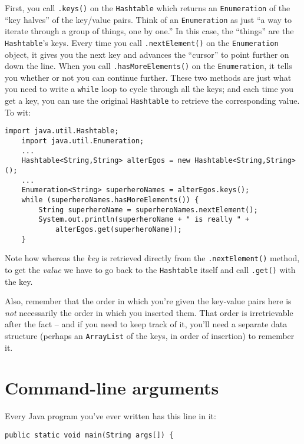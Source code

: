 First, you call \texttt{.keys()} on the \texttt{Hashtable} which returns an
\texttt{Enumeration} of the ``key halves'' of the key/value pairs. Think of an
\texttt{Enumeration} as just ``a way to iterate through a group of things, one
by one.'' In this case, the ``things'' are the \texttt{Hashtable}'s keys. Every
time you call \texttt{.nextElement()} on the \texttt{Enumeration} object, it
gives you the next key and advances the ``cursor'' to point further on down the
line. When you call \texttt{.hasMoreElements()} on the \texttt{Enumeration},
it tells you whether or not you can continue further. These two methods are
just what you need to write a \texttt{while} loop to cycle through all the
keys; and each time you get a key, you can use the original \texttt{Hashtable}
to retrieve the corresponding value. To wit:

\begin{Verbatim}[fontsize=\small,samepage=true,frame=single]
    import java.util.Hashtable;
    import java.util.Enumeration;
    ...
    Hashtable<String,String> alterEgos = new Hashtable<String,String>();
    ...
    Enumeration<String> superheroNames = alterEgos.keys();
    while (superheroNames.hasMoreElements()) {
        String superheroName = superheroNames.nextElement();
        System.out.println(superheroName + " is really " +
            alterEgos.get(superheroName));
    }
\end{Verbatim}

Note how whereas the \textit{key} is retrieved directly from the
\texttt{.nextElement()} method, to get the \textit{value} we have to go back
to the \texttt{Hashtable} itself and call \texttt{.get()} with the key.

Also, remember that the order in which you're given the key-value pairs here
is \textit{not} necessarily the order in which you inserted them. That order
is irretrievable after the fact -- and if you need to keep track of it, you'll
need a separate data structure (perhaps an \texttt{ArrayList} of the keys, in
order of insertion) to remember it.

\section{Command-line arguments}

Every Java program you've ever written has this line in it:

\begin{Verbatim}[fontsize=\footnotesize,samepage=true,frame=single]
    public static void main(String args[]) {
\end{Verbatim}

